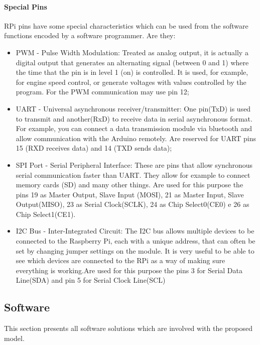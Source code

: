 \documentclass{acm_proc_article-sp}
\begin{document}
\paragraph{Special Pins}
RPi pins have some special characteristics which can be used from the software functions encoded by a software programmer. Are they:
\begin{itemize}

\item PWM - Pulse Width Modulation: Treated as analog output, it is actually a digital output that generates an alternating signal (between 0 and 1) where the time that the pin is in level 1 (on) is controlled. It is used, for example, for engine speed control, or generate voltages with values controlled by the program. For the PWM communication may use pin 12;

\item UART - Universal asynchronous receiver/transmitter: One pin(TxD) is used to transmit and another(RxD) to receive data in serial asynchronous format. For example, you can connect a data transmission module via bluetooth and allow communication with the Arduino remotely. Are reserved for UART pins 15 (RXD receives data) and 14 (TXD sends data);%

\item SPI Port - Serial Peripheral Interface: These are pins that allow synchronous serial communication faster than UART. They allow for example to connect memory cards (SD) and many other things. Are used for this purpose the pins 19 as Master Output, Slave Input (MOSI), 21 as Master Input, Slave Output(MISO), 23 as Serial Clock(SCLK), 24 as Chip Select0(CE0) e 26 as Chip Select1(CE1).

\item I2C Bus - Inter-Integrated Circuit: The I2C bus allows multiple devices to be connected to the Raspberry Pi, each with a unique address, that can often be set by changing jumper settings on the module. It is very useful to be able to see which devices are connected to the RPi as a way of making sure everything is working.Are used for this purpose the pins 3 for Serial Data Line(SDA) and pin 5 for Serial Clock Line(SCL)
\end{itemize}

\subsection{Software}
This section presents all software solutions which are involved with the proposed model.
\end{document}
